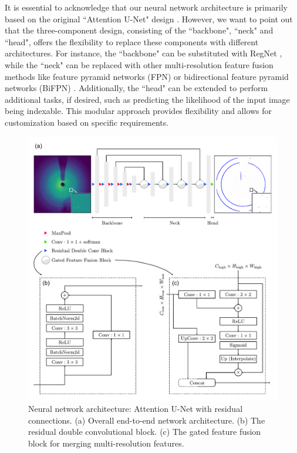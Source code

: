 \documentclass[a4paper]{article}
\begin{document}
It is essential to acknowledge that our neural network architecture is primarily
based on the original ``Attention U-Net" design
\citep{oktayAttentionUNetLearning2018}.  However, we want to point out that the
three-component design, consisting of the ``backbone", ``neck" and ``head",
offers the flexibility to replace these components with different architectures.
For instance, the ``backbone" can be substituted with RegNet
\citep{radosavovicDesigningNetworkDesign2020}, while the ``neck" can be replaced
with other multi-resolution feature fusion methods like feature pyramid networks
(FPN) \citep{linFeaturePyramidNetworks2017} or bidirectional feature pyramid
networks (BiFPN) \citep{tanEfficientDetScalableEfficient2020}.  Additionally,
the ``head" can be extended to perform additional tasks, if desired, such as
predicting the likelihood of the input image being indexable.  This modular
approach provides flexibility and allows for customization based on specific
requirements.

\begin{figure}[!ht]
\includegraphics[width=\textwidth,keepaspectratio]
{./figures/network_arc.pdf}
\caption{Neural network architecture: Attention U-Net with residual connections.
(a) Overall end-to-end network architecture.  (b) The residual double
convolutional block.  (c) The gated feature fusion block for merging
multi-resolution features.}
\label{fig : network arc}
\end{figure}
\end{document}
